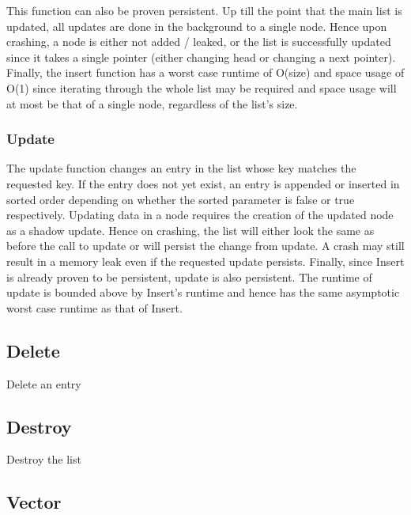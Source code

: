 \documentclass[twocolumn]{article}
\begin{document}
This function can also be proven persistent. Up till the point that the main
list is updated, all updates are done in the background to a single node. Hence
upon crashing, a node is either not added / leaked, or the list is successfully
updated since it takes a single pointer (either changing head or changing a next
pointer). Finally, the insert function has a worst case runtime of O(size) and
space usage of O(1) since iterating through the whole list may be required and
space usage will at most be that of a single node, regardless of the list's
size.

\subsubsection{Update}


The update function changes an entry in the list whose key matches the requested
key. If the entry does not yet exist, an entry is appended or inserted in sorted
order depending on whether the sorted parameter is false or true respectively.
Updating data in a node requires the creation of the updated node as a shadow
update. Hence on crashing, the list will either look the same as before the call
to update or will persist the change from update. A crash may still result in a
memory leak even if the requested update persists. Finally, since Insert is
already proven to be persistent, update is also persistent. The runtime of
update is bounded above by Insert's runtime and hence has the same asymptotic
worst case runtime as that of Insert.

\subsection{Delete}

Delete an entry

\subsection{Destroy}

Destroy the list

\subsection{Vector}
\end{document}
